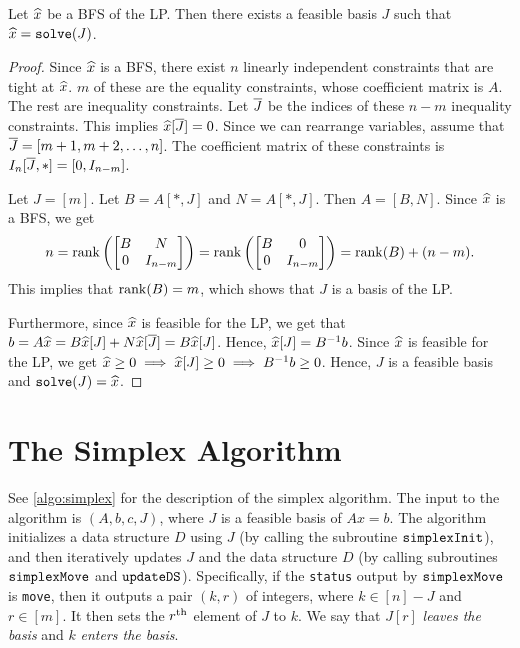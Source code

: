 \begin{lemma}
\label{thm:bfs-gives-basis}
Let $\widehat{x}$ be a BFS of the LP. Then there exists a feasible basis $J$
such that $\widehat{x} = \operatorname{\mathtt{solve}}(J)$.
\end{lemma}
\begin{proof}
Since $\widehat{x}$ is a BFS, there exist $n$ linearly independent constraints that are tight at $\widehat{x}$.
$m$ of these are the equality constraints, whose coefficient matrix is $A$.
The rest are inequality constraints.
Let $\overline{J}$ be the indices of these $n-m$ inequality constraints.
This implies $\widehat{x}[\overline{J}] = 0$.
Since we can rearrange variables, assume \wLoG{} that $\overline{J} = [m+1, m+2, \ldots, n]$.
The coefficient matrix of these constraints is $I_n[\overline{J},*] = [0, I_{n-m}]$.

Let $J = [m]$. Let $B = A[*,J]$ and $N = A[*,J]$. Then $A = [B, N]$. Since $\widehat{x}$ is a BFS, we get
\[ n = \operatorname{rank}\left(\begin{bmatrix}B & N \\ 0 & I_{n-m}\end{bmatrix}\right)
= \operatorname{rank}\left(\begin{bmatrix}B & 0 \\ 0 & I_{n-m}\end{bmatrix}\right)
= \operatorname{rank}(B) + (n-m). \]
This implies that $\operatorname{rank}(B) = m$, which shows that $J$ is a basis of the LP.

Furthermore, since $\widehat{x}$ is feasible for the LP, we get that
$b = A\widehat{x} = B\widehat{x}[J] + N\widehat{x}[\overline{J}] = B\widehat{x}[J]$.
Hence, $\widehat{x}[J] = B^{-1}b$. Since $\widehat{x}$ is feasible for the LP,
we get $\widehat{x} \ge 0 \implies \widehat{x}[J] \ge 0 \implies B^{-1}b \ge 0$.
Hence, $J$ is a feasible basis and $\operatorname{\mathtt{solve}}(J) = \widehat{x}$.
\end{proof}

\section{The Simplex Algorithm}

See \cref{algo:simplex} for the description of the simplex algorithm.
The input to the algorithm is $(A, b, c, J)$, where $J$ is a feasible basis of $Ax = b$.
The algorithm initializes a data structure $D$ using $J$
(by calling the subroutine $\operatorname{\mathtt{simplexInit}}$),
and then iteratively updates $J$ and the data structure $D$
(by calling subroutines $\operatorname{\mathtt{simplexMove}}$ and $\operatorname{\mathtt{updateDS}}$).
Specifically, if the \texttt{status} output by $\operatorname{\mathtt{simplexMove}}$ is \texttt{move},
then it outputs a pair $(k, r)$ of integers, where $k \in [n] - J$ and $r \in [m]$.
It then sets the $r^{\textrm{th}}$ element of $J$ to $k$.
We say that $J[r]$ \emph{leaves the basis} and $k$ \emph{enters the basis}.

